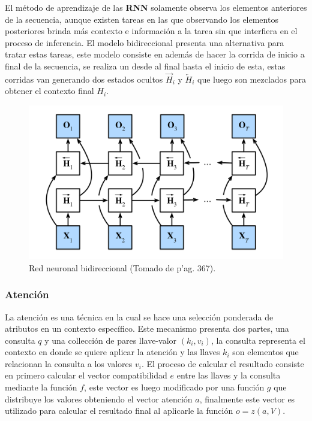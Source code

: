 El método de aprendizaje de las \textbf{RNN} solamente observa los elementos anteriores de la secuencia, aunque existen
tareas en las que observando los elementos posteriores brinda más contexto e información a la tarea sin que interfiera
en el proceso de inferencia. El modelo bidireccional presenta una alternativa para tratar estas tareas, este modelo
consiste en además de hacer la corrida de inicio a final de la secuencia, se realiza un desde al final hasta el  
inicio de esta, estas corridas van generando dos estados ocultos $\overrightarrow{H}_{i}$ y $\overleftarrow{H}_{i}$
que luego son mezclados para obtener el contexto final $H_i$.

\begin{figure}[h!]
	\begin{center}
		\begin{center}
			\includegraphics[scale=.3]{Graphics/rnn_bidirectional.png}
        \end{center}
	    \caption{Red neuronal bidireccional (Tomado de \cite{d2l} p'ag. 367).}\label{fig:rnn_bidirectional}
	\end{center}
\end{figure}


\subsubsection{Atención}

La atención es una técnica en la cual se hace una selección ponderada de atributos en un contexto específico. 
Este mecanismo presenta dos partes, una consulta $q$ y una collección de pares llave-valor $(k_i, v_i)$, la 
consulta representa el contexto en donde se quiere aplicar la atención y las llaves $k_i$ son elementos que 
relacionan la consulta a los valores $v_i$. El proceso de calcular el resultado consiste en primero calcular 
el vector compatibilidad $e$ entre las llaves y la consulta mediante la función $f$, este vector es luego 
modificado por una función $g$ que distribuye los valores obteniendo el vector atención $a$, finalmente 
este vector es utilizado para calcular el resultado final al aplicarle la función $o = z(a, V)$.

